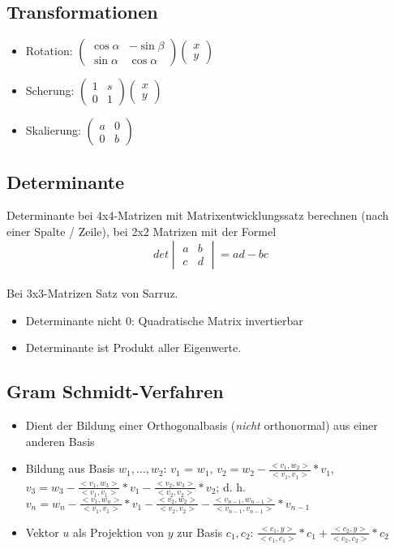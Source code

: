 \documentclass[12pt,landscape]{article}
\begin{document}
\begin{multicols}{3}
\subsection{Transformationen}
\begin{itemize}
\item Rotation: $\begin{pmatrix}
\cos \alpha & -\sin \beta \\ \sin \alpha & \cos \alpha 
\end{pmatrix}\begin{pmatrix}
x \\ y
\end{pmatrix}$
\item Scherung: $\begin{pmatrix}
1 & s \\ 0 & 1
\end{pmatrix}\begin{pmatrix}
x \\ y
\end{pmatrix}$
\item Skalierung: $\begin{pmatrix}
a & 0 \\ 0 & b
\end{pmatrix}$
\end{itemize}
\subsection{Determinante}
Determinante bei 4x4-Matrizen mit Matrixentwicklungssatz berechnen (nach einer Spalte / Zeile), bei 2x2 Matrizen mit der Formel \[ det \begin{vmatrix}a & b \\ c & d\end{vmatrix} = ad - bc \]\\
Bei 3x3-Matrizen Satz von Sarruz.
\begin{itemize}
\item Determinante nicht 0: Quadratische Matrix invertierbar
\item Determinante ist Produkt aller Eigenwerte.
\end{itemize}
\subsection{Gram Schmidt-Verfahren}
\begin{itemize}
\item Dient der Bildung einer Orthogonalbasis (\textit{nicht} orthonormal) aus einer anderen Basis
\item Bildung aus Basis $w_1, ... , w_2$: $v_1$ = $w_1$, $v_2 = w_2 - \frac{<v_1, w_2>}{<v_1, v_1>} * v_1$, $v_3 = w_3 - \frac{<v_1, w_3>}{<v_1, v_1>} * v_1 - \frac{<v_2, w_3>}{<v_2, v_2>} * v_2$; d. h. $v_n = w_n - \frac{<v_1, w_n>}{<v_1, v_1>} * v_1 - \frac{<v_2, w_2>}{<v_2, v_2>} - \frac{<v_{n-1}, w_{n-1}>}{<v_{n-1}, v_{n-1}>} * v_{n-1}$
\item Vektor $u$ als Projektion von $y$ zur Basis $c_1, c_2$: $\frac{<c_1, y>}{<c_1, c_1>} * c_1 + \frac{<c_2, y>}{<c_2, c_2>} * c_2$
\end{itemize}

\end{multicols}
\end{document}
